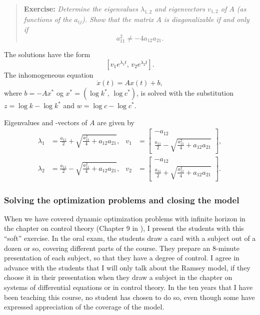 \documentclass[graybox]{svmult}
\begin{document}
\begin{quote}
\textbf{Exercise:} \textit{Determine the eigenvalues $\lambda_{1,2}$ and eigenvectors $v_{1,2}$ of $A$ (as functions of the $a_{ij}$).  Show that the matrix $A$ is diagonalizable if and only if}
\[
a_{11}^2 \neq -4 a_{12}a_{21}.
\]
\end{quote}

The solutions have the form
\[
[v_1 e^{\lambda_1 t},\, v_2 e^{\lambda_2 t}  ].
\]
The inhomogeneous equation 
\[
\dot{x}(t) = A x(t) + b,
\]
where $b = - A x^*$ og $x^*=(\log k^*,\, \log c^*)$, is solved with the substitution $z= \log k -\log k^*$ and $w= \log c -\log c^*$.


Eigenvalues and -vectors of $A$ are given by
\begin{align*}
\lambda_1 &= \frac{a_{11}}{2} + \sqrt{\frac{a_{11}^2}{4} + a_{12}a_{21}}, & v_1 &= \left[\begin{array}{c} -a_{12} \\ \frac{a_{11}}{2} - \sqrt{\frac{a_{11}^2}{4} + a_{12}a_{21}} \end{array}\right],\\
\lambda_2 &= \frac{a_{11}}{2} - \sqrt{\frac{a_{11}^2}{4} + a_{12}a_{21}}, & v_2 &= \left[\begin{array}{c} -a_{12} \\ \frac{a_{11}}{2} + \sqrt{\frac{a_{11}^2}{4} + a_{12}a_{21}} \end{array}\right].
\end{align*}


\subsubsection{Solving the optimization problems and closing the model}

When we have covered dynamic optimization problems with infinite horizon in the chapter on control theory (Chapter 9 in \cite{Sydsaeter2008}), I present the students with this ``soft'' exercise. In the oral exam, the students draw a card with a subject out of a dozen or so, covering different parts of the course. They prepare an 8-minute presentation of each subject, so that they have a degree of control.  I agree in advance with the students that I will only talk about the Ramsey model, if they choose it in their presentation when they draw a subject in the chapter on systems of differential equations or in control theory. In the ten years that I have been teaching this course, no student has chosen to do so, even though some have expressed appreciation of the coverage of the model.
\end{document}
